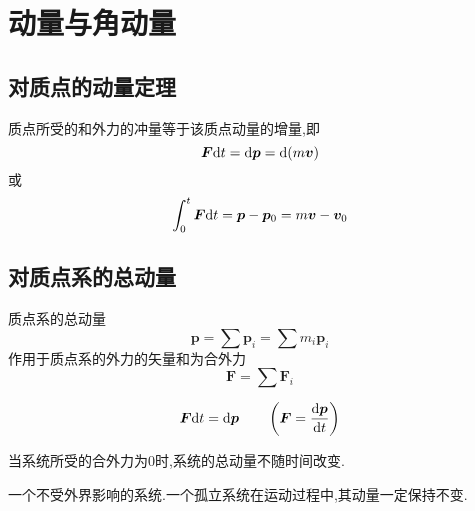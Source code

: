 \chapter{动量与角动量}
\thispagestyle{empty}
\section{对质点的动量定理}
质点所受的和外力的冲量等于该质点动量的增量,即
\begin{equation}
\bm{F} {\rm{d}} t={\rm{d}} \bm{p}={\rm{d}} (m\bm{v})
\end{equation}
或
\begin{equation}
\int_{0}^{t} \bm{F}{\rm{d}} t= \bm{p}-\bm{p}_0=m\bm{v}-\bm{v}_0
\end{equation}

\section{对质点系的总动量}
质点系的总动量
\begin{equation}
\bm{p}=\sum\bm{p}_i=\sum m_i\bm{p}_i
\end{equation}
作用于质点系的外力的矢量和为合外力
\begin{equation}
\bm{F}=\sum\bm{F}_i
\end{equation}
\par {}
\begin{equation}
\bm{F}{\rm{d}} t = {\rm{d}} \bm{p}\quad \quad \left( \bm{F}=\frac{{\rm{d}} \bm{p}}{{\rm{d}} t}\right) 
\end{equation}
\par {}\jg
{}
\par 当系统所受的合外力为0时,系统的总动量不随时间改变.\jg
\par {} 一个不受外界影响的系统.一个孤立系统在运动过程中,其动量一定保持不变.


